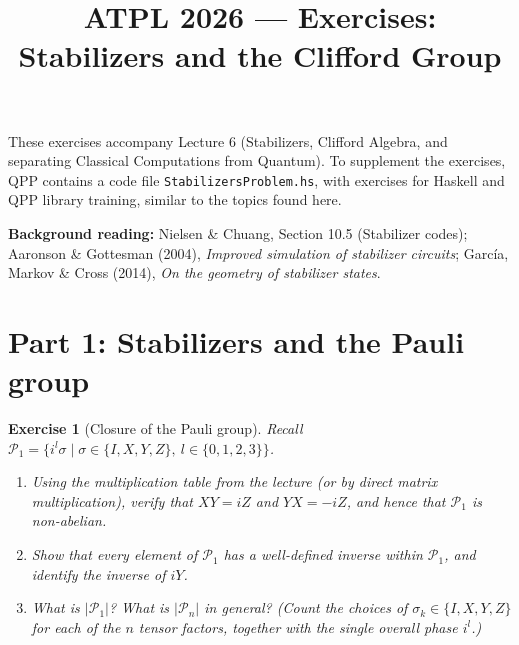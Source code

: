 \documentclass[11pt]{article}
\title{ATPL 2026 --- Exercises: Stabilizers and the Clifford Group}
\author{}
\date{}
\newtheorem*{exercise}{Exercise}
\newcommand{\Pn}{\mathcal{P}_n}
\begin{document}
\maketitle
\vspace{-2em}

\noindent
These exercises accompany Lecture 6 (Stabilizers, Clifford Algebra, and separating
Classical Computations from Quantum). To supplement the exercises, QPP contains a
code file \texttt{StabilizersProblem.hs}, with exercises for Haskell and QPP
library training, similar to the topics found here.

\medskip
\noindent
\textbf{Background reading:} Nielsen \& Chuang, Section 10.5 (Stabilizer
codes); Aaronson \& Gottesman (2004), \emph{Improved simulation of stabilizer
circuits}; Garc\'ia, Markov \& Cross (2014), \emph{On the geometry of
stabilizer states}.

\bigskip
\section*{Part 1: Stabilizers and the Pauli group}

\begin{exercise}[Closure of the Pauli group]
Recall $\mathcal{P}_1 = \{ i^l \sigma \mid \sigma \in \{I,X,Y,Z\},\ l \in \{0,1,2,3\}\}$.
\begin{enumerate}[label=(\alph*)]
    \item Using the multiplication table from the lecture (or by direct
    matrix multiplication), verify that $XY = iZ$ and $YX = -iZ$, and hence
    that $\mathcal{P}_1$ is \emph{non-abelian}.
    \item Show that every element of $\mathcal{P}_1$ has a well-defined
    inverse within $\mathcal{P}_1$, and identify the inverse of $iY$.
    \item What is $|\mathcal{P}_1|$? What is $|\Pn|$ in general? (Count the
    choices of $\sigma_k \in \{I,X,Y,Z\}$ for each of the $n$ tensor factors,
    together with the single overall phase $i^l$.)
\end{enumerate}
\end{exercise}
\end{document}
